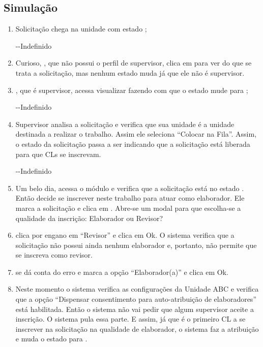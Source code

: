 \begin{landscape}
\subsection*{Simulação}

\begin{enumerate}
	\item Solicitação \SOLD chega na unidade com estado ;

	{}{-}{-}{Indefinido}
	
	\item Curioso, \EQ, que não possui o perfil de supervisor, clica em \bVisualizar para ver do que se trata a solicitação, mas nenhum estado muda já que ele não é supervisor.

	\item \ST, que é supervisor, acessa visualizar fazendo com que o estado mude para ;

	{}{-}{-}{Indefinido}
	
	\item Supervisor \ST analisa a solicitação e verifica que sua unidade é a unidade destinada a realizar o trabalho. Assim ele seleciona ``Colocar na Fila''. Assim, o estado da solicitação passa a ser  indicando que a solicitação está liberada para que CLs se inscrevam.
	
	{}{-}{-}{Indefinido}	
	
	\item Um belo dia, \ET acessa o módulo e verifica que a solicitação \SOLD está no estado . Então decide se inscrever neste trabalho para atuar como elaborador. Ele marca a solicitação e clica em \bInscrever. Abre-se um modal para que escolha-se a qualidade da inscrição: Elaborador ou Revisor?
	
	\item \ET clica por engano em ``Revisor'' e clica em Ok. O sistema verifica que a solicitação não possui ainda nenhum elaborador e, portanto, não permite que \ET se inscreva como revisor. 
	
	\item \ET se dá conta do erro e marca a opção  ``Elaborador(a)'' e clica em Ok.
	
	\item Neste momento o sistema verifica as configurações da Unidade ABC e verifica que a opção ``Dispensar consentimento para auto-atribuição de elaboradores'' está habilitada. Então o sistema não vai pedir que algum supervisor aceite a inscrição. O sistema pula essa parte. E assim, já que \ET é o primeiro CL a se inscrever na solicitação na qualidade de elaborador, o sistema faz a atribuição e muda o estado para .


\end{enumerate}
\end{landscape}
